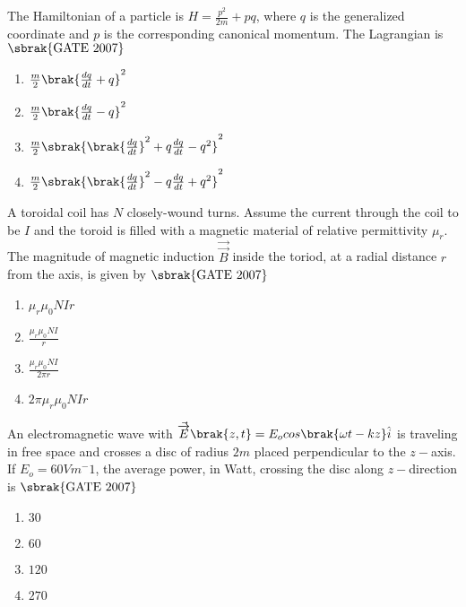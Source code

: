 \item The Hamiltonian of a particle is $H = \frac{p^2}{2m} + pq$, where $q$ is the generalized coordinate and $p$ is the corresponding canonical momentum. The Lagrangian is \hfill{$\sbrak{\text{GATE 2007}}$} 
\begin{multicols}{2}
\begin{enumerate}
    \item $\frac{m}{2}\brak{\frac{dq}{dt} + q}^2$
    \item $\frac{m}{2}\brak{\frac{dq}{dt} - q}^2$
    \item $\frac{m}{2}\sbrak{\brak{\frac{dq}{dt}}^2 + q\frac{dq}{dt}-q^2}^2$
    \item $\frac{m}{2}\sbrak{\brak{\frac{dq}{dt}}^2 - q\frac{dq}{dt}+q^2}^2$
\end{enumerate}
\end{multicols}
\item A toroidal coil has $N$ closely-wound turns. Assume the current through the coil to be $I$ and the toroid is filled with a magnetic material of relative permittivity $\mu_r$. The magnitude of magnetic induction $\Vec{\overrightarrow{B}}$ inside the toriod, at a radial distance $r$ from the axis, is given by 
\hfill{$\sbrak{\text{GATE 2007}}$} 
\begin{multicols}{4}
\begin{enumerate}
    \item $\mu_r\mu_0NIr$
    \item $\frac{\mu_r\mu_0NI}{r}$
    \item $\frac{\mu_r\mu_0NI}{2\pi r}$
    \item $2\pi\mu_r\mu_0NIr$
\end{enumerate}
\end{multicols}
\item An electromagnetic wave with $\Vec{\overrightarrow{E
}}\brak{z,t} = E_ocos\brak{\omega t-kz}\hat{i}$ is traveling in free space and crosses a disc of radius $2 m$ placed perpendicular to the $z-$axis. If $E_o = 60 V m^-1$, the average power, in Watt, crossing the disc along $z-$direction is 
\hfill{$\sbrak{\text{GATE 2007}}$} \begin{multicols}{4}  
\begin{enumerate}
    \item $30$
    \item $60$
    \item $120$
    \item $270$
\end{enumerate}
\end{multicols}
